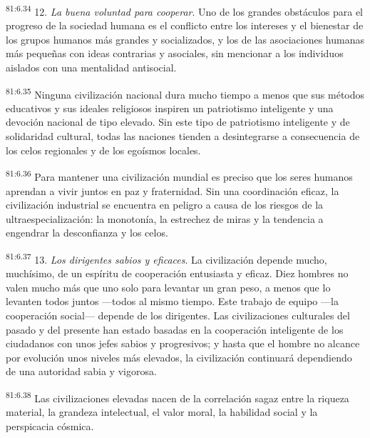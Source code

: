 \par
\textsuperscript{81:6.34} 12. \textit{La buena voluntad para cooperar}. Uno de los grandes obstáculos para el progreso de la sociedad humana es el conflicto entre los intereses y el bienestar de los grupos humanos más grandes y socializados, y los de las asociaciones humanas más pequeñas con ideas contrarias y asociales, sin mencionar a los individuos aislados con una mentalidad antisocial.

\par
\textsuperscript{81:6.35} Ninguna civilización nacional dura mucho tiempo a menos que sus métodos educativos y sus ideales religiosos inspiren un patriotismo inteligente y una devoción nacional de tipo elevado. Sin este tipo de patriotismo inteligente y de solidaridad cultural, todas las naciones tienden a desintegrarse a consecuencia de los celos regionales y de los egoísmos locales.

\par
\textsuperscript{81:6.36} Para mantener una civilización mundial es preciso que los seres humanos aprendan a vivir juntos en paz y fraternidad. Sin una coordinación eficaz, la civilización industrial se encuentra en peligro a causa de los riesgos de la ultraespecialización: la monotonía, la estrechez de miras y la tendencia a engendrar la desconfianza y los celos.

\par
\textsuperscript{81:6.37} 13. \textit{Los dirigentes sabios y eficaces}. La civilización depende mucho, muchísimo, de un espíritu de cooperación entusiasta y eficaz. Diez hombres no valen mucho más que uno solo para levantar un gran peso, a menos que lo levanten todos juntos ---todos al mismo tiempo. Este trabajo de equipo ---la cooperación social--- depende de los dirigentes. Las civilizaciones culturales del pasado y del presente han estado basadas en la cooperación inteligente de los ciudadanos con unos jefes sabios y progresivos; y hasta que el hombre no alcance por evolución unos niveles más elevados, la civilización continuará dependiendo de una autoridad sabia y vigorosa.

\par
\textsuperscript{81:6.38} Las civilizaciones elevadas nacen de la correlación sagaz entre la riqueza material, la grandeza intelectual, el valor moral, la habilidad social y la perspicacia cósmica.

